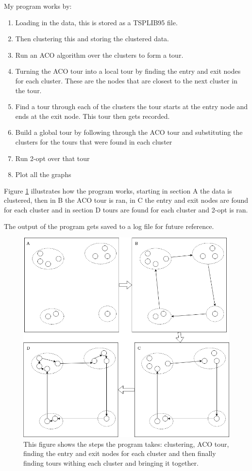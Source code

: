 My program works by:
\begin{enumerate}
    \item Loading in the data, this is stored as a TSPLIB95 file.
    \item Then clustering this and storing the clustered data.
    \item Run an ACO algorithm over the clusters to form a tour.
    \item Turning the ACO tour into a local tour by finding the entry and exit nodes for each cluster. These are the nodes that are closest to the next cluster in the tour.
    \item Find a tour through each of the clusters the tour starts at the entry node and ends at the exit node. This tour then gets recorded.
    \item Build a global tour by following through the ACO tour and substituting the clusters for the tours that were found in each cluster
    \item Run 2-opt over that tour
    \item Plot all the graphs
\end{enumerate}

Figure \ref{fig:run_diagram} illustrates how the program works, starting in section A the data is clustered, then in B the ACO tour is ran, in C the entry and exit nodes are found for each cluster and in section D tours are found for each cluster and 2-opt is ran.

The output of the program gets saved to a log file for future reference.

\begin{figure}
    \centering
    \includegraphics[width=\textwidth]{figures/diagram_design_how.png}
    \caption{This figure shows the steps the program takes: clustering, ACO tour, finding the entry and exit nodes for each cluster and then finally finding tours withing each cluster and bringing it together.}
    \label{fig:run_diagram}
\end{figure}

